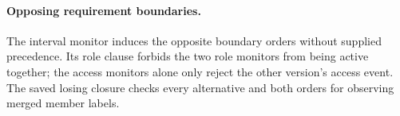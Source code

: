 \paragraph{Opposing requirement boundaries.}

The interval monitor induces the opposite boundary orders without supplied precedence. Its role clause forbids the two role monitors from being active together; the access monitors alone only reject the other version's access event. The saved losing closure checks every alternative and both orders for observing merged member labels.
